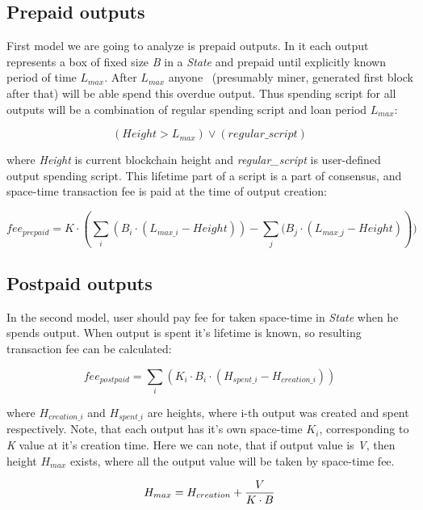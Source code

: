 \documentclass[]{article}   %
\newcommand{\state}{\textit{State}}
\begin{document}
\subsection{Prepaid outputs}

First model we are going to analyze is prepaid outputs. In it each output represents a box of fixed size \textit{B} in a \state{} and prepaid until explicitly known period of time $L_{max}$. After $L_{max}$ anyone ~(presumably miner, generated first block after that) will be able spend this overdue output. Thus spending script for all outputs will be a combination of regular spending script and loan period $L_{max}$:

\begin{equation}
(Height > L_{max}) \lor (regular\_script)
\end{equation}

where \textit{Height} is current blockchain height and \textit{regular\_script} is user-defined output spending script. This lifetime part of a script is a part of consensus, and space-time transaction fee is paid at the time of output creation:

\begin{equation}
fee_{prepaid} = K \cdot (\sum_i{(B_i \cdot (L_{max\_i} - Height))} - \sum_j{(B_j \cdot (L_{max\_j} - Height)}))
\end{equation}

\subsection{Postpaid outputs}

In the second model, user should pay fee for taken space-time in \state{} when he spends output. When output is spent it's lifetime is known, so resulting transaction fee can be calculated:

\begin{equation}
fee_{postpaid} = \sum_i{(K_i \cdot B_i \cdot (H_{spent\_i} - H_{creation\_i}))}
\end{equation}

where $H_{creation\_i}$ and $H_{spent\_i}$ are heights, where i-th output was created and spent respectively. Note, that each output has it's own space-time \textit{$K_i$}, corresponding to \textit{K} value at it's creation time. Here we can note, that if output value is \textit{V}, then height \textit{$H_{max}$} exists, where all the output value will be taken by space-time fee.

\begin{equation}
H_{max} = {H_{creation} + {V \over {K \cdot B}}}
\end{equation}
\end{document}
